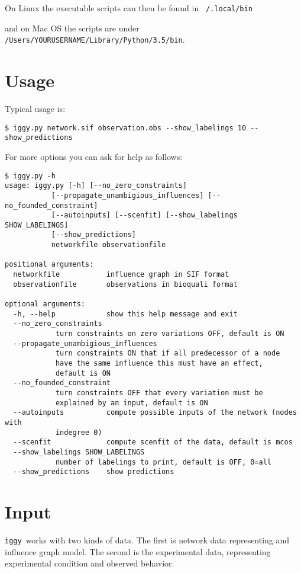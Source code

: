 \documentclass{article}
\newcommand\iggy{\texttt{iggy}}
\begin{document}
On Linux the executable scripts can then be found in \texttt{~/.local/bin}

and on Mac OS the scripts are under \texttt{/Users/YOURUSERNAME/Library/Python/3.5/bin}.



\section{Usage}

Typical usage is:
\begin{Verbatim}[frame=single]
$ iggy.py network.sif observation.obs --show_labelings 10 --show_predictions
\end{Verbatim}
For more options you can ask for help as follows:
\begin{Verbatim}[frame=single]
$ iggy.py -h        
usage: iggy.py [-h] [--no_zero_constraints]
           [--propagate_unambigious_influences] [--no_founded_constraint]
           [--autoinputs] [--scenfit] [--show_labelings SHOW_LABELINGS]
           [--show_predictions]
           networkfile observationfile

positional arguments:
  networkfile           influence graph in SIF format
  observationfile       observations in bioquali format

optional arguments:
  -h, --help            show this help message and exit
  --no_zero_constraints
            turn constraints on zero variations OFF, default is ON
  --propagate_unambigious_influences
            turn constraints ON that if all predecessor of a node
            have the same influence this must have an effect,
            default is ON
  --no_founded_constraint
            turn constraints OFF that every variation must be
            explained by an input, default is ON
  --autoinputs          compute possible inputs of the network (nodes with
            indegree 0)
  --scenfit             compute scenfit of the data, default is mcos
  --show_labelings SHOW_LABELINGS
            number of labelings to print, default is OFF, 0=all
  --show_predictions    show predictions
\end{Verbatim} 


\section{Input}

\iggy\ works with two kinds of data. 
The first is network data representing and influence graph model. 
The second is the experimental data, representing experimental condition and observed behavior.
\end{document}
